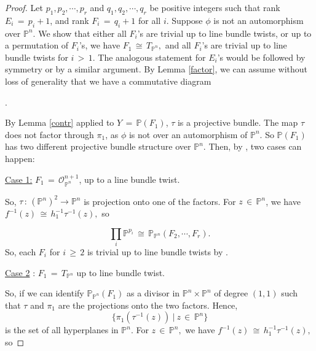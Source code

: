 \documentclass[12pt,reqno]{amsart}
\theoremstyle{definition}
\numberwithin{equation}{section}
\begin{document}
\begin{proof}
Let $p_1,p_2,\cdots,p_r$ and $q_1, q_2,\cdots,q_r$ be positive integers such that rank $E_i\,=\,p_i+1$, and rank $F_i\,=\,q_i+1$ for all $i$.
Suppose $ \phi$ is not an automorphism over $ \mathbb{P}^n.$ We show that either all $F_i$'s are trivial up to line bundle twists, or up to a permutation of $F_i$'s, we have $F_{1} \,\cong\, T_{\mathbb{P}^n},$ and all $F_i$'s are trivial up to line bundle twists for $ i\,>\,1.$ The analogous statement for $E_i$'s would be followed by symmetry or by a similar argument.
By Lemma \ref{factor}, we can assume without loss of generality that we have a commutative diagram 
\begin{center}
.
\end{center}
By Lemma \ref{contr} applied to $Y\,=\,\mathbb{P}(F_1)$,  $\tau$ is a projective bundle. The map $\tau$ does not factor through $\pi_1$, as $ \phi$ is not over an automorphism of $ \mathbb{P}^n.$ So $ \mathbb{P}(F_{1})$ has two different projective bundle structure over $ \mathbb{P}^n.$ Then, by \cite{Sa}, two cases can happen:

\underline{Case 1:} $F_{1}\,=\,\mathcal{O}_{\mathbb{P}^n}^{n+1}$, up to a line bundle twist. 

So, $\tau\,:\,(\mathbb{P}^n)^2\to \mathbb{P}^n$ is projection onto one of the factors. For $z\,\in\, \mathbb{P}^n$, we have $f^{-1}(z) \,\cong\, h_{1}^{-1} \tau^{-1}(z), $ so 

  $$ \prod_{i} \mathbb{P}^{p_{i}} \,\cong\, \mathbb{P}_{\mathbb{P}^n}(F_{2},\cdots , F_{r}).$$ So, each $ F_{i}$ for $i\, \geq\, 2$ is trivial up to line bundle twists by {\cite[Theorem 3.17]{BSV1}}.   

  \underline{Case 2} : $F_{1} \,=\, T_{\mathbb{P}^n}$ up to line bundle twist. 

So, if we can identify $\mathbb{P}_{\mathbb{P}^n}(F_1)$ as a divisor in $\mathbb{P}^n\times \mathbb{P}^n$ of degree $(1,1)$ such that $\tau$ and $\pi_1$ are the projections onto the two factors. Hence, 
$$  \{ \pi_1( \tau^{-1}(z)) \medspace | \medspace z \,\in\, \mathbb{P}^n \}$$ is the set of all hyperplanes in $ \mathbb{P}^n  $. For $z\,\in\, \mathbb{P}^n,$ we have $ f^{-1}(z) \,\cong\, h_{1}^{-1} \tau^{-1}(z),$ so 


\end{proof}
\end{document}
